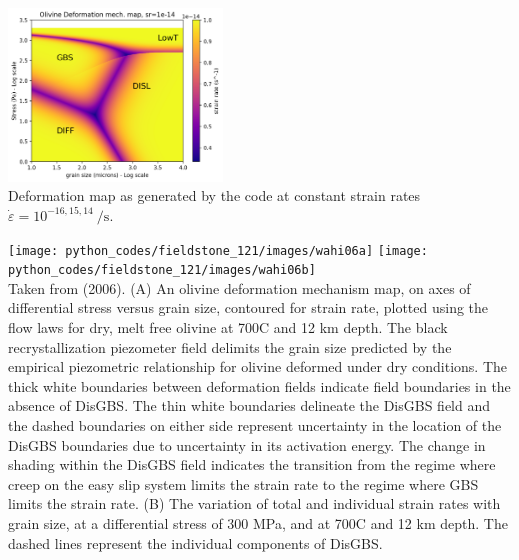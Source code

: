 \begin{center}
\includegraphics[width=5.7cm]{python_codes/fieldstone_121/results/constant_strainrate_deformation_map2_1e-14.png}\\
{\captionfont Deformation map as generated by the code at constant strain rates
$\dot\varepsilon=10^{-16,15,14}~\si{\per\second}$.}
\end{center}





\begin{center}
\texttt{[image: python\_codes/fieldstone\_121/images/wahi06a]}
\texttt{[image: python\_codes/fieldstone\_121/images/wahi06b]}\\
{\captionfont Taken from \textcite{wahi06} (2006).
(A) An olivine deformation mechanism map, on axes of
differential stress versus grain size, contoured for strain rate, plotted
using the flow laws for dry, melt free olivine at 700C and 12 km
depth. The black recrystallization piezometer field delimits
the grain size predicted by the empirical piezometric relationship for
olivine deformed under dry conditions. The thick white
boundaries between deformation fields indicate field boundaries in the
absence of DisGBS. The thin white boundaries delineate the DisGBS
field and the dashed boundaries on either side represent uncertainty in
the location of the DisGBS boundaries due to uncertainty in its
activation energy. The change in shading within the DisGBS field
indicates the transition from the regime where creep on the easy slip
system limits the strain rate to the regime where GBS limits the strain
rate. (B) The variation of total and individual strain rates with grain
size, at a differential stress of 300 MPa, and at 700C and 12 km depth.
The dashed lines represent the individual components of DisGBS.} 
\end{center}



